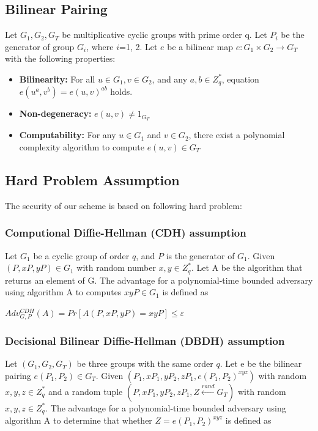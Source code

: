 \documentclass[journal,10pt]{IEEEtran}
\begin{document}
\subsection{Bilinear Pairing}
Let $G_1, G_2, G_T$ be multiplicative cyclic groups with prime order q. Let $P_i$ be the generator of group $G_i$, where $i$=1, 2. Let $e$ be a bilinear map $e : G_1 \times G_2 \to G_T$ with the following properties:
\begin{itemize}
  \item \textbf{Bilinearity:}
  For all $u \in G_1, v \in G_2$, and any $a,b \in Z_q^*$, equation $e(u^a,v^b) = e(u,v)^{ab}$ holds.
  \item \textbf{Non-degeneracy:}
  $e(u,v) \neq 1_{G_T}$
  \item \textbf{Computability:}
  For any $u \in G_1$ and $v \in G_2$, there exist a polynomial complexity algorithm to  compute $e(u,v) \in G_T$
  
\end{itemize}

\subsection{Hard Problem Assumption} 
The security of our scheme is based on following hard problem:
\subsubsection{Computional Diffie-Hellman (CDH) assumption \cite{Introduction to Modern Cryptography}}
 Let $G_1$ be a cyclic group of order $q$, and $P$ is the generator of $G_1$. Given $(P,xP,yP) \in G_1$ with random number %
 $x,y \in Z_q^*$. Let A be the algorithm that returns an element of G. The advantage for a polynomial-time bounded adversary using algorithm A to computes $xyP \in G_1$ is defined as

\begin{center}
$Adv_{G,P}^{CDH}(A) = Pr[A(P,xP,yP) = xyP] \leq \varepsilon$
\end{center}

\subsubsection{Decisional Bilinear Diffie-Hellman (DBDH) assumption \cite{New directions in cryptography}}
Let $(G_1, G_2, G_T)$ be three groups with the same order $q$. Let e be the bilinear pairing $e(P_1, P_2) \in G_T$. Given $(P_1,xP_1,yP_2,zP_1,e(P_1,P_2)^{xyz})$ with random $x,y,z \in Z_q^*$ and a random tuple $(P,xP_1,yP_2,zP_1,Z\xleftarrow[]{rand}G_T)$ with random $x,y,z \in Z_q^*$. The advantage for a polynomial-time bounded adversary using algorithm A to determine that whether $Z=e(P_1,P_2)^{xyz}$ is defined as
\end{document}
